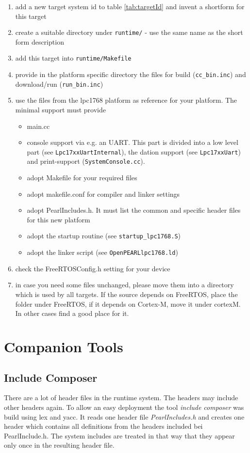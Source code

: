 \begin{enumerate}
\item add a new target system id to table \ref{tab:targetId} and 
      invent a shortform for this target
\item create a suitable directory under \verb|runtime/| - use the same name
   as the short form description
\item add this target into \verb|runtime/Makefile| 
\item provide in the platform specific directory the files for
      build (\verb|cc_bin.inc|) and download/run (\verb|run_bin.inc|)
\item use the files from the lpc1768 platform as reference for your
      platform. The minimal support must provide 
      \begin{itemize}
      \item main.cc
      \item console support via e.g. an UART. This part is divided
            into a low level part (see \verb|Lpc17xxUartInternal|), 
            the dation support (see \verb|Lpc17xxUart|)
            and print-support (\verb|SystemConsole.cc|).
      \item adopt Makefile for your required files
      \item adopt makefile.conf for compiler and linker settings
      \item adopt PearlIncludes.h. It must list the common and specific 
            header files for this new platform
      \item adopt the startup routine (see \verb|startup_lpc1768.S|)
      \item adopt the linker script (see \verb|OpenPEARLlpc1768.ld|)
      \end{itemize}
\item check the FreeRTOSConfig.h setting for your device
\item in case you need some files unchanged, please move them into a 
      directory which is used by all targets. If the source depends on
      FreeRTOS, place the folder under FreeRTOS, if it depends on 
      Cortex-M, move it under cortexM. In other cases find a good place for
      it.
\end{enumerate}

\section{Companion Tools}
\subsection{Include Composer}
There are a lot of header files in the runtime system. 
The headers may include other headers again.
To allow an easy deployment the tool {\em include composer} 
was build using lex and yacc. It reads one header file {\em PearlIncludes.h}
and creates one header which contains all definitions from the headers
included bei PearlInclude.h. The system includes are treated in that way
that they appear only once in the resulting header file.

